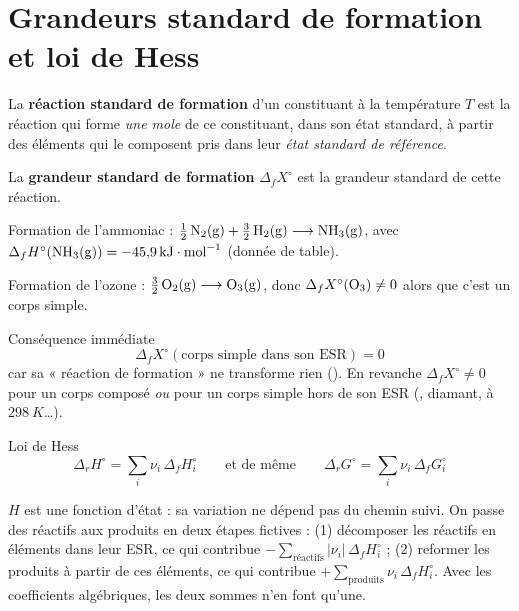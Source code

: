 \section{Grandeurs standard de formation et loi de Hess}

\begin{definition}
La \textbf{réaction standard de formation} d'un constituant à la température $T$ est la réaction qui forme \emph{une mole} de ce constituant, dans son état standard, à partir des éléments qui le composent pris dans leur \emph{état standard de référence}.

\noindent La \textbf{grandeur standard de formation} $\Delta_fX^\circ$ est la grandeur standard de cette réaction.
\end{definition}

\begin{exemple}
Formation de l'ammoniac : $\tfrac12\,\ce{N2(g)} + \tfrac32\,\ce{H2(g)} \longrightarrow \ce{NH3(g)}$, avec $\Delta_fH^\circ(\ce{NH3(g)}) = \SI{-45,9}{kJ.mol^{-1}}$ (donnée de table).

\noindent Formation de l'ozone : $\tfrac32\,\ce{O2(g)} \longrightarrow \ce{O3(g)}$, donc $\Delta_fX^\circ(\ce{O3}) \neq 0$ alors que c'est un corps simple.
\end{exemple}

\begin{resultat}{Conséquence immédiate}
\[ \boxed{\Delta_fX^\circ(\text{corps simple dans son ESR}) = 0} \]
car sa « réaction de formation » ne transforme rien (). En revanche $\Delta_fX^\circ \neq 0$ pour un corps composé \emph{ou} pour un corps simple hors de son ESR (, diamant,  à $\SI{298}{K}$\dots).
\end{resultat}

\begin{resultat}{Loi de Hess}
\[ \boxed{\Delta_rH^\circ = \sum_i \nu_i\,\Delta_fH^\circ_i} \qquad\text{et de même}\qquad \Delta_rG^\circ = \sum_i\nu_i\,\Delta_fG^\circ_i \]
\end{resultat}

\begin{demo}
$H$ est une fonction d'état : sa variation ne dépend pas du chemin suivi. On passe des réactifs aux produits en deux étapes fictives : (1) décomposer les réactifs en éléments dans leur ESR, ce qui contribue $-\sum_{\text{réactifs}}|\nu_i|\,\Delta_fH^\circ_i$ ; (2) reformer les produits à partir de ces éléments, ce qui contribue $+\sum_{\text{produits}}\nu_i\,\Delta_fH^\circ_i$. Avec les coefficients algébriques, les deux sommes n'en font qu'une.
\end{demo}

